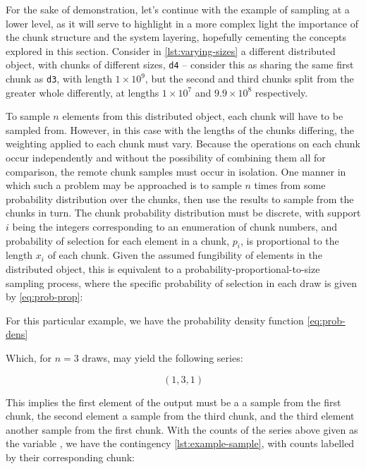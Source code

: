 For the sake of demonstration, let's continue with the example of
sampling at a lower level, as it will serve to highlight in a more
complex light the importance of the chunk structure and the system
layering, hopefully cementing the concepts explored in this section.
Consider in \cref{lst:varying-sizes} a different distributed object, with chunks of different sizes,
\texttt{d4} -- consider this as sharing the same first chunk as
\texttt{d3}, with length \(1 \times 10^9\), but the second and third
chunks split from the greater whole differently, at lengths
\(1 \times 10^7\) and \(9.9 \times 10^8\) respectively.


To sample \(n\) elements from this distributed object, each chunk will
have to be sampled from. However, in this case with the lengths of the
chunks differing, the weighting applied to each chunk must vary. Because
the operations on each chunk occur independently and without the
possibility of combining them all for comparison, the remote chunk
samples must occur in isolation. One manner in which such a problem may
be approached is to sample \(n\) times from some probability
distribution over the chunks, then use the results to sample from the
chunks in turn. The chunk probability distribution must be discrete,
with support \(i\) being the integers corresponding to an enumeration of
chunk numbers, and probability of selection for each element in a chunk,
\(p_i\), is proportional to the length \(x_i\) of each chunk. Given the
assumed fungibility of elements in the distributed object, this is
equivalent to a probability-proportional-to-size sampling process, where
the specific probability of selection in each draw is given by \cref{eq:prob-prop}:


For this particular example, we have the probability density
function \cref{eq:prob-dens}




Which, for \(n=3\) draws, may yield the following series:

\[
    (1, 3, 1)
\]

This implies the first element of the output must be a a sample from the
first chunk, the second element a sample from the third chunk, and the
third element another sample from the first chunk. With the counts of
the series above given as the variable , we have
the contingency \cref{lst:example-sample}, with counts labelled by their
corresponding chunk:

